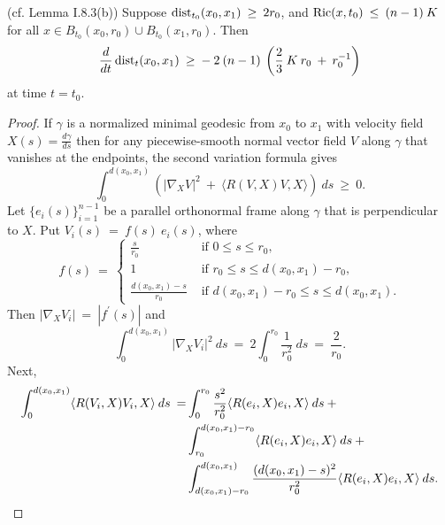 \begin{lemma}
  \label{lem:kl-length-distortion-estimates-distance-distortion-lemma}
 \label{distancedist} (cf. Lemma I.8.3(b))
Suppose $\operatorname{dist}_{t_0}(x_0, x_1) \: \ge \: 2r_0$, and
$\operatorname{Ric}(x, t_0) \: \le \: (n-1) \: K$ for all $x\in B_{t_0}(x_0, r_0) \cup
B_{t_0}(x_1, r_0)$. Then
\begin{equation}
\frac{d}{dt} \operatorname{dist}_t(x_0, x_1) \: \ge \:
- \: 2 \: (n-1) \: \left( \frac23 \: K \: r_0 \: + \: r_0^{-1} \right)
\end{equation}
at time $t = t_0$.
\end{lemma}
\begin{proof}
If $\gamma$ is a normalized minimal geodesic from $x_0$ to $x_1$ with
velocity field $X(s) = \frac{d\gamma}{ds}$ then
for any piecewise-smooth
normal
vector field $V$ along $\gamma$ that vanishes at the
endpoints, the second variation formula gives
\begin{equation}
\int_0^{d(x_0, x_1)} \left( \Big| \nabla_X V \Big|^2 \: + \:
\langle R(V, X)V, X \rangle \right) \: ds \: \ge \: 0.
\end{equation}
Let $\{e_i(s)\}_{i=1}^{n-1}$ be a parallel orthonormal frame along
$\gamma$ that is perpendicular to $X$.
Put $V_i(s) \: = \: f(s) \: e_i(s)$, where
\begin{equation}
f(s) \: = \:
\begin{cases}
\frac{s}{r_0} & \text{ if } 0 \le s \le r_0, \\
1 & \text{ if } r_0 \le s \le d(x_0, x_1)-r_0, \\
\frac{d(x_0, x_1)-s}{r_0} & \text{ if } d(x_0, x_1)-r_0 \le s \le d(x_0, x_1).
\end{cases}
\end{equation}
Then $\Big| \nabla_X V_i \Big| \: = \: |f^\prime(s)|$ and
\begin{equation}
\int_0^{d(x_0, x_1)}  \Big| \nabla_X V_i \Big|^2 \: ds \: = \:
2 \int_0^{r_0} \frac{1}{r_0^2} \: ds \: = \: \frac{2}{r_0}.
\end{equation}
Next,
\begin{align}
\int_0^{d(x_0, x_1)}
\langle R(V_i, X)V_i, X \rangle \: ds \: = &
\int_0^{r_0} \frac{s^2}{r_0^2} \langle R(e_i, X)e_i, X \rangle \: ds \: +  \\
& \int_{r_0}^{d(x_0,x_1)-r_0} \langle R(e_i, X)e_i, X \rangle \: ds \: + \notag \\
& \int_{d(x_0,x_1)-r_0}^{d(x_0,x_1)} \frac{(d(x_0,x_1) - s)^2}{r_0^2} \langle R(e_i, X)e_i, X \rangle \: ds.

\end{align}
\end{proof}
